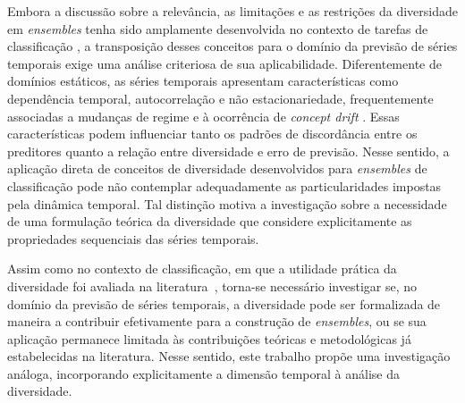 Embora a discussão sobre a relevância, as limitações e as restrições da diversidade em \textit{ensembles} tenha sido amplamente desenvolvida no contexto de tarefas de classificação \cite{didaciDiversityClassifierEnsembles2013}, a transposição desses conceitos para o domínio da previsão de séries temporais exige uma análise criteriosa de sua aplicabilidade. Diferentemente de domínios estáticos, as séries temporais apresentam características como dependência temporal, autocorrelação e não estacionariedade, frequentemente associadas a mudanças de regime e à ocorrência de \textit{concept drift} \cite{cerqueiraArbitrageForecastingExperts2019, saadallahDriftBasedDynamicEnsemble2020}. Essas características podem influenciar tanto os padrões de discordância entre os preditores quanto a relação entre diversidade e erro de previsão. Nesse sentido, a aplicação direta de conceitos de diversidade desenvolvidos para \textit{ensembles} de classificação pode não contemplar adequadamente as particularidades impostas pela dinâmica temporal. Tal distinção motiva a investigação sobre a necessidade de uma formulação teórica da diversidade que considere explicitamente as propriedades sequenciais das séries temporais.




Assim como no contexto de classificação, em que a utilidade prática da diversidade foi avaliada na literatura~\cite{didaciDiversityClassifierEnsembles2013}, torna-se necessário investigar se, no domínio da previsão de séries temporais, a diversidade pode ser formalizada de maneira a contribuir efetivamente para a construção de \textit{ensembles}, ou se sua aplicação permanece limitada às contribuições teóricas e metodológicas já estabelecidas na literatura. Nesse sentido, este trabalho propõe uma investigação análoga, incorporando explicitamente a dimensão temporal à análise da diversidade.


